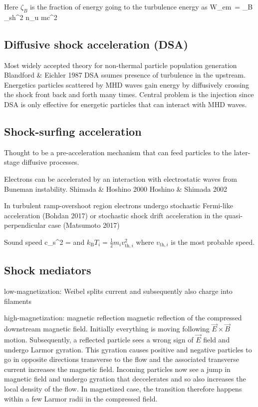 \documentclass{aa}
\begin{document}
Here $\zeta_B$ is the fraction of energy going to the turbulence energy as
\be
W_{em} = \zeta_B \gamma_{sh}^2 n_u mc^2
\ee




\subsection{Diffusive shock acceleration (DSA)}
Most widely accepted theory for non-thermal particle population generation 
Blandford \& Eichler 1987
DSA ssumes presence of turbulence in the upstream.
Energetics particles scattered by MHD waves gain energy by diffusively crossing the shock front back and forth many times.
Central problem is the injection since DSA is only effective for energetic particles that can interact with MHD waves.


\subsection{Shock-surfing acceleration}
Thought to be a pre-acceleration mechanism that can feed particles to the later-stage diffusive processes.

Electrons can be accelerated by an interaction with electrostatic waves from Buneman instability.
Shimada \& Hoshino 2000
Hoshino \& Shimada 2002

In turbulent ramp-overshoot region electrons undergo stochastic Fermi-like acceleration (Bohdan 2017) or stochastic shock drift acceleration in the quasi-perpendicular case (Matsumoto 2017)

Sound speed
\be
c_s^2 = 
\ee
and $k_{\mathrm{B}} T_i = \frac{1}{2} m_i v_{\mathrm{th},i}^2$ where $v_{\mathrm{th},i}$ is the most probable speed.






\subsection{Shock mediators}
low-magnetization: Weibel
splits current and subsequently also charge into filaments

high-magnetization: magnetic reflection
magnetic reflection of the compressed downstream magnetic field.
Initially everything is moving following $\vec{E} \times \vec{B}$ motion.
Subsequently, a reflected particle sees a wrong sign of $\vec{E}$ field  and undergo Larmor gyration.
This gyration causes positive and negative particles to go in opposite directions transverse to the flow and the associated transverse current increases the magnetic field.
Incoming particles now see a jump in magnetic field and undergo gyration that deccelerates and so also increases the local density of the flow.
In magnetized case, the transition therefore happens within a few Larmor radii in the compressed field.
\end{document}
